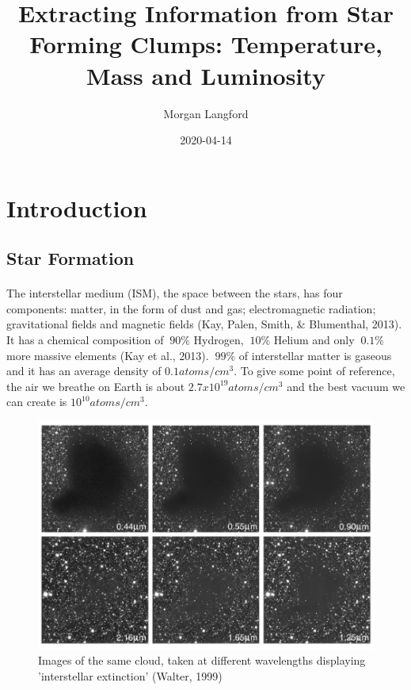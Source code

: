 \documentclass{article}
\title{Extracting Information from Star Forming Clumps: Temperature, Mass and Luminosity}
\date{2020-04-14}
\author{Morgan Langford}
\begin{document}
\maketitle
\newpage
{}

\tableofcontents
\newpage

\section{Introduction}
\subsection{Star Formation}
\paragraph{}

The interstellar medium (ISM), the space between the stars, has four components: matter, in the form of dust and gas; electromagnetic radiation; gravitational fields and magnetic fields (Kay, Palen, Smith, \& Blumenthal, 2013). It has a chemical composition of $~90\%$ Hydrogen, $~10\%$ Helium and only $~0.1\%$ more massive elements (Kay et al., 2013). $~99\%$ of interstellar matter is gaseous and it has an average density of $0.1 atoms/cm^3$. To give some point of reference, the air we breathe on Earth is about $2.7 x 10^{19} atoms/cm^3$ and the best vacuum we can create is $10^{10} atoms/cm^3$. 

\begin{figure}[h!]
\includegraphics[width=\linewidth]{dust.jpg}
\caption{Images of the same cloud, taken at different wavelengths displaying 'interstellar extinction' (Walter, 1999)}
\label{fig:dust1}
\end{figure}
\end{document}
